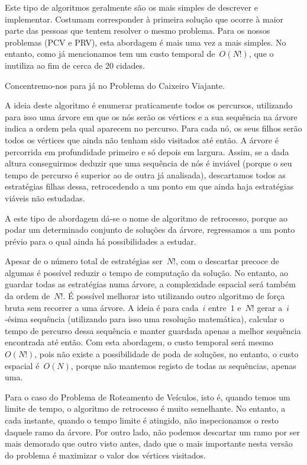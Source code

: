 \documentclass[12pt,a4paper,reqno]{report}
\numberwithin{figure}{section}
\numberwithin{equation}{section}
\begin{document}
Este tipo de algoritmos geralmente são os mais simples de descrever e implementar. Costumam corresponder à primeira solução que ocorre à maior parte das pessoas que tentem resolver o mesmo problema. Para os nossos problemas (PCV e PRV), esta abordagem é mais uma vez a mais simples. No entanto, como já mencionamos tem um custo temporal de~$O(N!)$, que o inutiliza ao fim de cerca de 20 cidades.

Concentremo-nos para já no Problema do Caixeiro Viajante.

A ideia deste algoritmo é enumerar praticamente todos os percursos, utilizando para isso uma árvore em que os nós serão os vértices e a sua sequência na árvore indica a ordem pela qual aparecem no percurso. Para cada nó, os seus filhos serão todos os vértices que ainda não tenham sido visitados até então. A árvore é percorrida em profundidade primeiro e só depois em largura. Assim, se a dada altura conseguirmos deduzir que uma sequência de nós é inviável (porque o seu tempo de percurso é superior ao de outra já analisada), descartamos todos as estratégias filhas dessa, retrocedendo a um ponto em que ainda haja estratégias viáveis não estudadas.

A este tipo de abordagem dá-se o nome de algoritmo de retrocesso, porque ao podar um determinado conjunto de soluções da árvore, regressamos a um ponto prévio para o qual ainda há possibilidades a estudar.

Apesar de o número total de estratégias ser~$N!$, com o descartar precoce de algumas é possível reduzir o tempo de computação da solução. No entanto, ao guardar todas as estratégias numa árvore, a complexidade espacial será também da ordem de~$N!$. É possível melhorar isto utilizando outro algoritmo de força bruta sem recorrer a uma árvore. A ideia é para cada~$i$ entre~$1$ e~$N!$ gerar a~$i$-ésima sequência (utilizando para isso uma resolução matemática), calcular o tempo de percurso dessa sequência e manter guardada apenas a melhor sequência encontrada até então. Com esta abordagem, o custo temporal será mesmo~$O(N!)$, pois não existe a possibilidade de poda de soluções, no entanto, o custo espacial é~$O(N)$, porque não mantemos registo de todas as sequências, apenas uma.

Para o caso do Problema de Roteamento de Veículos, isto é, quando temos um limite de tempo, o algoritmo de retrocesso é muito semelhante. No entanto, a cada instante, quando o tempo limite é atingido, não inspecionamos o resto daquele ramo da árvore. Por outro lado, não podemos descartar um ramo por ser mais demorado que outro visto antes, dado que o mais importante nesta versão do problema é maximizar o valor dos vértices visitados.
\end{document}
